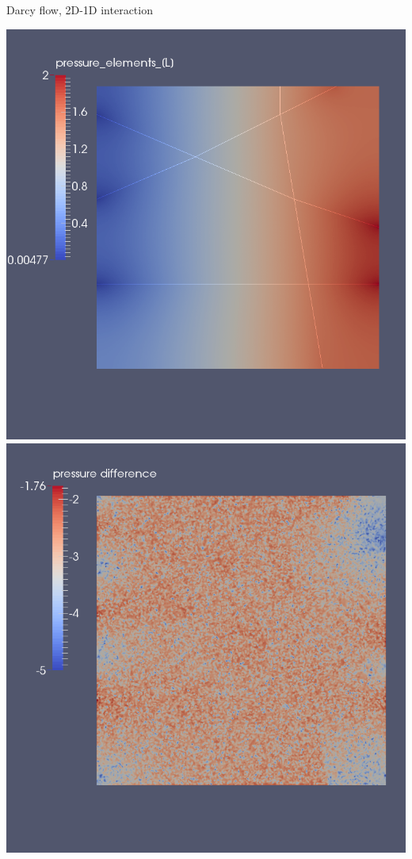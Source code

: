 \documentclass[10pt]{beamer} %
\begin{document}
\begin{frame}{Darcy flow, 2D-1D interaction}
    
 \begin{center}
  \includegraphics[scale=0.2]{graphics/boundary_P1.png}
  \includegraphics[scale=0.2]{graphics/boundary_P1-comp.png}
 \end{center}


\end{frame}
\end{document}
